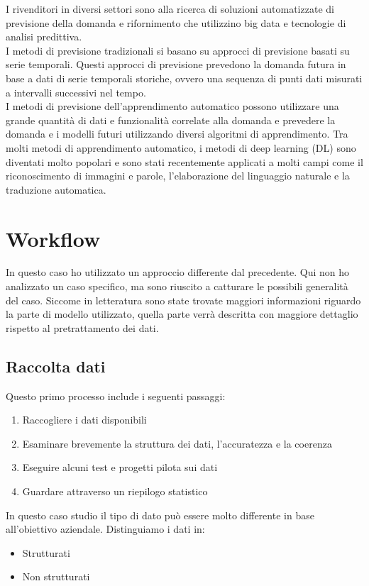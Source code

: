 \documentclass[12pt,a4paper]{report}
\begin{document}
I rivenditori in diversi settori sono alla ricerca di soluzioni automatizzate di previsione della domanda e rifornimento che utilizzino big data e tecnologie di analisi predittiva. \\
I metodi di previsione tradizionali si basano su approcci di previsione basati su serie temporali. Questi approcci di previsione prevedono la domanda futura in base a dati di serie temporali storiche, ovvero una sequenza di punti dati misurati a intervalli successivi nel tempo.\\
I metodi di previsione dell'apprendimento automatico possono utilizzare una grande quantità di dati e funzionalità correlate alla domanda e prevedere la domanda e i modelli futuri utilizzando diversi algoritmi di apprendimento. Tra molti metodi di apprendimento automatico, i metodi di deep learning (DL) sono diventati molto popolari e sono stati recentemente applicati a molti campi come il riconoscimento di immagini e parole, l'elaborazione del linguaggio naturale e la traduzione automatica. 

\section{Workflow}
In questo caso ho utilizzato un approccio differente dal precedente. Qui non ho analizzato un caso specifico, ma sono riuscito a catturare le possibili generalità del caso. Siccome in letteratura sono state trovate maggiori informazioni riguardo la parte di modello utilizzato, quella parte verrà descritta con maggiore dettaglio rispetto al pretrattamento dei dati.

\subsection{Raccolta dati}
Questo primo processo include i seguenti passaggi: \cite{mobidev:demandForecast}
\begin{enumerate}
    \item Raccogliere i dati disponibili
    \item Esaminare brevemente la struttura dei dati, l'accuratezza e la coerenza
    \item Eseguire alcuni test e progetti pilota sui dati
    \item Guardare attraverso un riepilogo statistico
\end{enumerate}

In questo caso studio il tipo di dato può essere molto differente in base all'obiettivo aziendale. Distinguiamo i dati in:
\begin{itemize}
    \item Strutturati
    \item Non strutturati
\end{itemize}
\end{document}
